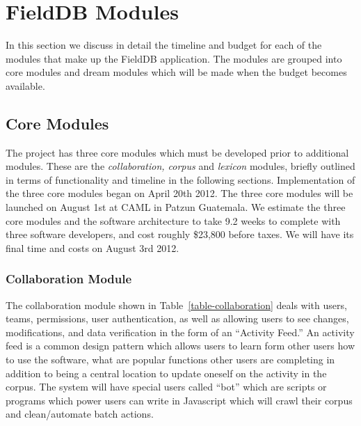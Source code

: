 \documentclass[12 pt]{article}
\begin{document}
\section{FieldDB Modules}

In this section we discuss in detail the timeline and budget for each of the modules that make up the FieldDB application. The modules are grouped into core modules and dream modules which will be made when the budget becomes available. 

\label{sec:modules}
\subsection{Core Modules}

The project has three core modules which must be developed prior to additional modules. These are the {\it collaboration, corpus} and {\it lexicon} modules, briefly outlined in terms of functionality and timeline in the following sections.  Implementation of the three core modules began on April 20th 2012. The three core modules will be launched on August 1st at CAML in Patzun Guatemala. We estimate the three core modules and the software architecture to take 9.2 weeks to complete with three software developers,  and cost roughly \$23,800 before taxes. We will have its final time and costs on August 3rd 2012.


\newpage
\subsubsection{Collaboration Module}
The collaboration module shown in Table~\ref{table-collaboration}  deals with users, teams, permissions, user authentication,  as well as allowing users to see changes, modifications, and data verification in the form of an ``Activity Feed.'' An activity feed is a common design pattern which allows users to learn form other users how to use the software, what are popular functions other users are completing in addition to being a central location to update oneself on the activity in the corpus. The system will have special users called ``bot'' which are scripts or programs which power users can write in Javascript which will crawl their corpus and clean/automate batch actions.
\end{document}
